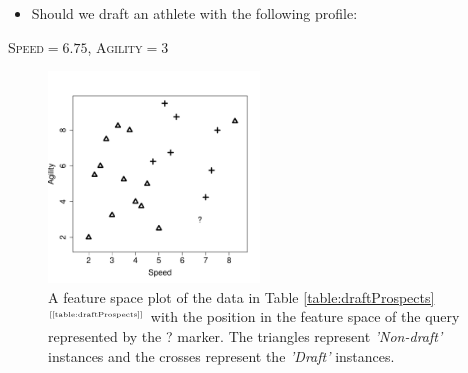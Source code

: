 \documentclass[xcolor={table}]{beamer}
\newcommand{\featN}[1]{\textsc{#1}}
\newcommand{\featL}[1]{\textit{'#1'}}
\newcommand{\ourRef}[1]{\ref{#1} $^{\text{\tiny[\pageref{#1}]}}$}
\begin{document}
\begin{frame}
\begin{example}
\begin{itemize}
	\item Should we draft an athlete with the following profile:
\end{itemize}
	\begin{center}
	 \featN{Speed}$=6.75$, \featN{Agility}$=3$
	 \end{center}
	 \end{example}
\end{frame}

 \begin{frame} 
\begin{figure}[htb]
       \begin{centering}
       \includegraphics[width=0.5\textwidth]{images/knn_fs_2.pdf}
       \caption{A feature space plot of the  data in Table \ourRef{table:draftProspects} with the position in the feature space of the query represented by the ? marker. The  triangles represent \featL{Non-draft} instances and the crosses represent the \featL{Draft} instances.}
       \label{fig:queryfeaturespace}
       \end{centering}
\end{figure}
\end{frame} 
\end{document}
